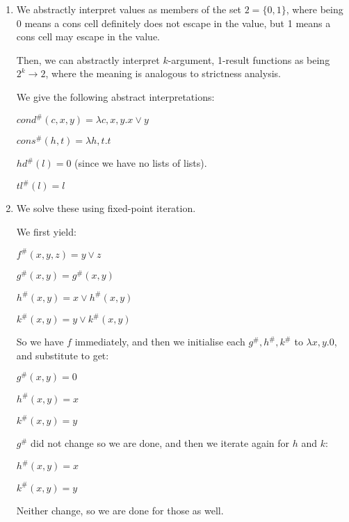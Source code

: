 \begin{enumerate}[label=(\alph*)]
\begin{enumerate}[label=(\roman*)]
\begin{enumerate}[label=(\roman*)]
            \item
              We abstractly interpret values as members of the set $2 = \{0,1\}$, where being 0 means a cons cell definitely does not escape in the value, but 1 means a cons cell may escape in the value.

              Then, we can abstractly interpret $k$-argument, 1-result functions as being $2^k \rightarrow 2$, where the meaning is analogous to strictness analysis.

              We give the following abstract interpretations:

              $cond^{\#}(c,x,y) = \lambda c,x,y. x \vee y$

              $cons^{\#}(h, t) = \lambda h,t. t$

              $hd^{\#}(l) = 0$ (since we have no lists of lists).

              $tl^{\#}(l) = l$

              \item
                We solve these using fixed-point iteration.

                We first yield:

                $f^{\#}(x,y,z) = y \vee z$

                $g^{\#}(x,y) = g^{\#}(x,y)$

                $h^{\#}(x,y) = x \vee h^{\#}(x,y)$

                $k^{\#}(x,y) = y \vee k^{\#}(x,y)$

                So we have $f$ immediately, and then we initialise each $g^{\#}, h^{\#}, k^{\#}$ to $\lambda x,y. 0$, and substitute to get:

                $g^{\#}(x,y) = 0$

                $h^{\#}(x,y) = x$

                $k^{\#}(x,y) = y$

                $g^{\#}$ did not change so we are done, and then we iterate again for $h$ and $k$:

                $h^{\#}(x,y) = x$

                $k^{\#}(x,y) = y$

                Neither change, so we are done for those as well.

              
          \end{enumerate}



        
    \end{enumerate}
        
    \end{enumerate}

